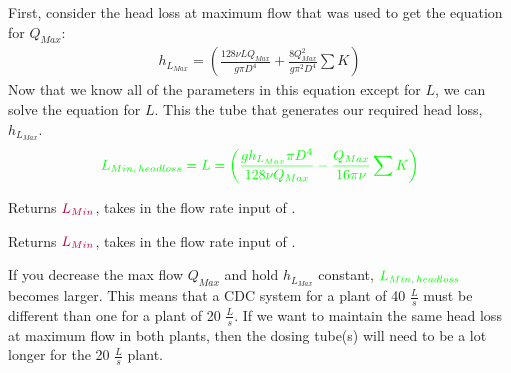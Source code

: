 \documentclass[letterpaper,10pt,english]{sphinxmanual}
\begin{document}
First, consider the head loss at maximum flow that was used to get the equation for \(Q_{Max}\):
\begin{equation}\label{equation:Flow_Control_and_Measurement/FCM_Derivations:Flow_Control_and_Measurement/FCM_Derivations:35}
\begin{split}h_{L_{Max}} = \left( \frac{128 \nu L{Q_{Max}}}{g \pi D^4} + \frac{8 Q_{Max}^2}{g \pi^2 D^4} \sum{K} \right)\end{split}
\end{equation}
Now that we know all of the parameters in this equation except for \(L\), we can solve the equation for \(L\). This the  tube that generates our required head loss, \(h_{L_{Max}}\).
\begin{equation}\label{equation:Flow_Control_and_Measurement/FCM_Derivations:Flow_Control_and_Measurement/FCM_Derivations:36}
\begin{split}\color{green}{
   L_{Min, \, head loss} = L = \left( \frac{g h_{L_{Max}} \pi D^4}{128 \nu Q_{Max}} - \frac{Q_{Max}}{16 \pi \nu} \sum{K} \right)
   }\end{split}
\end{equation}



  Returns \(\color{purple}{L_{Min}}\), takes in the flow rate input of .






  Returns \(\color{purple}{L_{Min}}\), takes in the flow rate input of .



If you decrease the max flow \(Q_{Max}\) and hold \(h_{L_{Max}}\) constant, \(\color{green}{L_{Min, \, head loss}}\) becomes larger. This means that a CDC system for a plant of 40 \(\frac{L}{s}\) must be different than one for a plant of 20 \(\frac{L}{s}\). If we want to maintain the same head loss at maximum flow in both plants, then the dosing tube(s) will need to be a lot longer for the 20 \(\frac{L}{s}\) plant.
\end{document}
